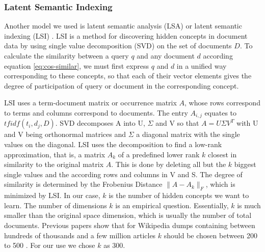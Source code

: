 \documentclass[a4paper]{article}
\begin{document}
\subsubsection{Latent Semantic Indexing}
Another model we used is latent semantic analysis (LSA) or latent semantic indexing (LSI) \cite{deerwester1990indexing}.
LSI is a method for discovering hidden concepts in document data by using single value decomposition (SVD) on the set of documents $D$.
To calculate the similarity between a query $q$ and any document $d$ according equation \ref{eq:cos-similar}, we must first express $q$ and $d$ in a unified way corresponding to these concepts, so that each of their vector elements gives the degree of participation of query or document in the corresponding concept. 

LSI uses a term-document matrix or occurrence matrix $A$, whose rows correspond to terms and columns correspond to documents. The entry $A_{i,j}$ equates to $tfidf(t_i, d_j, D)$. SVD decomposes A into U, $\Sigma$ and V so that $A = U \Sigma V^T $ with U and V being orthonormal matrices and $\Sigma$ a diagonal matrix with the single values on the diagonal.
LSI uses the decomposition to find a low-rank approximation, that is, a matrix $A_k$ of a predefined lower rank $k$ closest in similarity to the original matrix $A$. This is done by deleting all but the $k$ biggest single values and the according rows and columns in V and S.
The degree of similarity is determined by the Frobenius Distance $\|A-A_k\|_F$, which is minimized by LSI. In our case, $k$ is the number of hidden concepts we want to learn. The number of dimensions $k$ is an empirical question. Essentially, $k$ is much smaller than the original space dimension, which is usually the number of total documents. Previous papers show that for Wikipedia dumps containing between hundreds of thousands and a few million articles $k$ should be chosen between 200 to 500 \cite{bradford2008empirical}. For our use we chose $k$ as 300.
\end{document}
